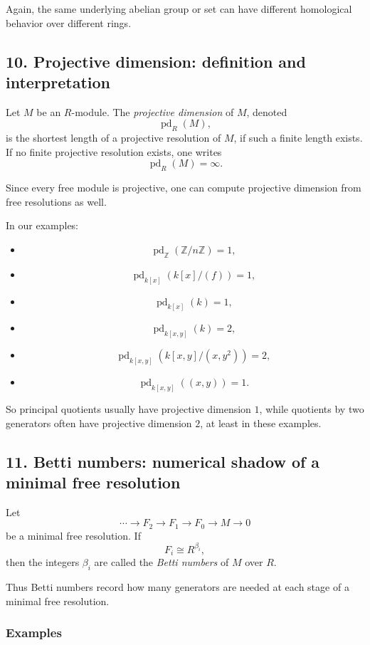 \documentclass[12pt,a4paper]{article}
\theoremstyle{notespace}
\theoremstyle{definition}
\begin{document}
Again, the same underlying abelian group or set can have different homological behavior over different rings.

\subsection{10. Projective dimension: definition and interpretation}

Let \(M\) be an \(R\)-module.
The \emph{projective dimension} of \(M\), denoted
\[
\operatorname{pd}_R(M),
\]
is the shortest length of a projective resolution of \(M\), if such a finite length exists.
If no finite projective resolution exists, one writes
\[
\operatorname{pd}_R(M)=\infty.
\]

Since every free module is projective, one can compute projective dimension from free resolutions as well.

In our examples:
\begin{itemize}
	\item
	\[
	\operatorname{pd}_{\mathbb Z}(\mathbb Z/n\mathbb Z)=1,
	\]
	\item
	\[
	\operatorname{pd}_{k[x]}(k[x]/(f))=1,
	\]
	\item
	\[
	\operatorname{pd}_{k[x]}(k)=1,
	\]
	\item
	\[
	\operatorname{pd}_{k[x,y]}(k)=2,
	\]
	\item
	\[
	\operatorname{pd}_{k[x,y]}(k[x,y]/(x,y^2))=2,
	\]
	\item
	\[
	\operatorname{pd}_{k[x,y]}((x,y))=1.
	\]
\end{itemize}

So principal quotients usually have projective dimension \(1\), while quotients by two generators often have projective dimension \(2\), at least in these examples.

\subsection{11. Betti numbers: numerical shadow of a minimal free resolution}

Let
\[
\cdots \longrightarrow F_2 \longrightarrow F_1 \longrightarrow F_0 \longrightarrow M \longrightarrow 0
\]
be a minimal free resolution.
If
\[
F_i \cong R^{\beta_i},
\]
then the integers \(\beta_i\) are called the \emph{Betti numbers} of \(M\) over \(R\).

Thus Betti numbers record how many generators are needed at each stage of a minimal free resolution.

\subsubsection*{Examples}
\end{document}
